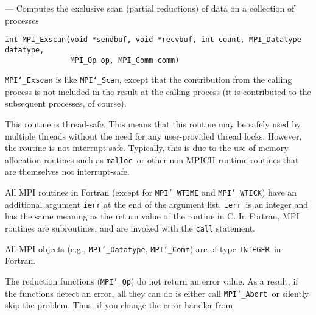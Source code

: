 \startmanpage
{}
--- Computes the exclusive scan (partial reductions) of data on a  collection of processes 
\startvb\begin{verbatim}
int MPI_Exscan(void *sendbuf, void *recvbuf, int count, MPI_Datatype datatype, 
               MPI_Op op, MPI_Comm comm)

\end{verbatim}
\endvb

\par
{}
\par
{}
{\tt MPI{\tt \char`\_}Exscan} is like {\tt MPI{\tt \char`\_}Scan}, except that the contribution from the
calling process is not included in the result at the calling process
(it is contributed to the subsequent processes, of course).
\par
{}
\par
This routine is thread-safe.  This means that this routine may be
safely used by multiple threads without the need for any user-provided
thread locks.  However, the routine is not interrupt safe.  Typically,
this is due to the use of memory allocation routines such as {\tt malloc
}or other non-MPICH runtime routines that are themselves not interrupt-safe.
\par
{}
All MPI routines in Fortran (except for {\tt MPI{\tt \char`\_}WTIME} and {\tt MPI{\tt \char`\_}WTICK}) have
an additional argument {\tt ierr} at the end of the argument list.  {\tt ierr
}is an integer and has the same meaning as the return value of the routine
in C.  In Fortran, MPI routines are subroutines, and are invoked with the
{\tt call} statement.
\par
All MPI objects (e.g., {\tt MPI{\tt \char`\_}Datatype}, {\tt MPI{\tt \char`\_}Comm}) are of type {\tt INTEGER
}in Fortran.
\par
{}
\par
The reduction functions ({\tt MPI{\tt \char`\_}Op}) do not return an error value.  As a result,
if the functions detect an error, all they can do is either call {\tt MPI{\tt \char`\_}Abort
}or silently skip the problem.  Thus, if you change the error handler from

